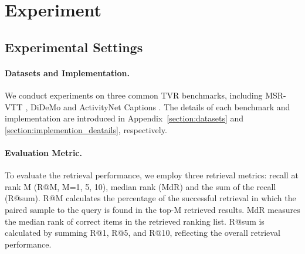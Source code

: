 \documentclass[11pt]{article}
\begin{document}
\section{Experiment}
\subsection{Experimental Settings}
\paragraph{Datasets and Implementation.} 
We conduct experiments on three common TVR benchmarks, including MSR-VTT \cite{xu2016msr}, DiDeMo \cite{anne2017localizing} and ActivityNet Captions \cite{caba2015activitynet}.
The details of each benchmark and implementation are introduced in Appendix~\ref{section:datasets} and \ref{section:implemention_deatails}, respectively.

\paragraph{Evaluation Metric.} To evaluate the retrieval performance, we employ three retrieval metrics: recall at rank M (R@M, M=1, 5, 10), median rank (MdR) and the sum of the recall (R@sum). 
R@M calculates the percentage of the successful retrieval in which the paired sample to the query is found in the top-M retrieved results.
MdR measures the median rank of correct items in the retrieved ranking list.
R@sum is calculated by summing R@1, R@5, and R@10, reflecting the overall retrieval performance.
\end{document}
